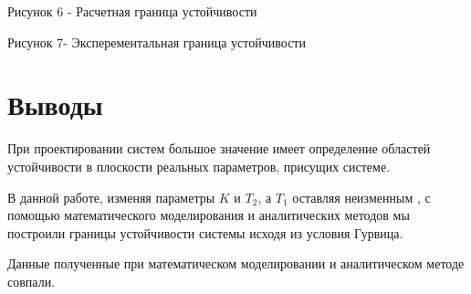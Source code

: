 \documentclass[a4paper, 12pt]{article}
\begin{document}
\begin{center}
\end{center}
\begin{center}
 \centering Рисунок 6 - Расчетная граница устойчивости
\end{center}
\begin{center}
\end{center} 
\begin{center}
 Рисунок 7- Эксперементальная  граница устойчивости 
\end{center}
\newpage
\section*{\centering Выводы}
При проектировании систем большое значение имеет определение областей устойчивости в плоскости реальных параметров, присущих системе.\par
 В данной работе, изменяя параметры $K$ и $T_2$, а $T_1$ оставляя неизменным , с помощью математического моделирования и аналитических методов мы построили границы устойчивости системы исходя из условия Гурвица.\par Данные полученные при математическом моделировании и аналитическом методе совпали. 
\end{document}
